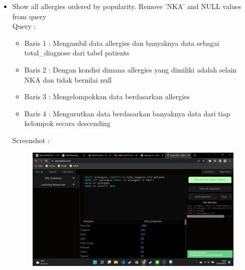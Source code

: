 \documentclass[]{article}
\begin{document}
\begin{itemize}
        \item Show all allergies ordered by popularity. Remove 'NKA' and NULL values from query
        \\Query :
        
        \begin{itemize}
            \item Baris 1 : Mengambil data allergies dan banyaknya data sebagai total\_diagnose dari tabel patients
            \item Baris 2 : Dengan kondisi dimana allergies yang dimiliki adalah selain NKA dan tidak bernilai null
            \item Baris 3 : Mengelompokkan data berdasarkan allergies
            \item Baris 4 : Mengurutkan data berdasarkan banyaknya data dari tiap kelompok secara descending
        \end{itemize}
        \pagebreak
        Screenshot :
        \begin{figure}[h]
            \includegraphics[scale=0.3]{./Screenshot/Medium-11.png}
            \centering
        \end{figure}


\end{itemize}
\end{document}
